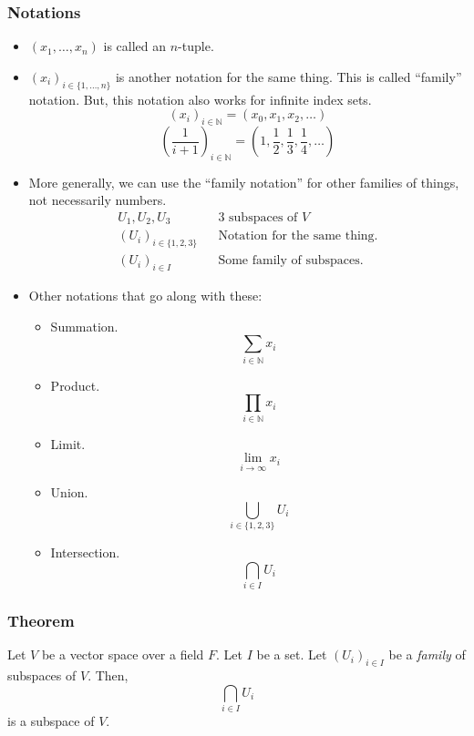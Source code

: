 \documentclass[11pt]{article}
\begin{document}
    \subsubsection{Notations}

    \begin{itemize}
        \item \((x_1, \dots, x_n)\) is called an $n$-tuple.
        \item \((x_i)_{i \in \{1, \dots, n\}}\) is another notation for the same thing. This is called ``family'' notation. But, this notation also works for infinite index sets. \[ (x_i)_{i \in \mathbb{N}} = (x_0, x_1, x_2, \dots) \] \[ \left( \frac{1}{i + 1} \right)_{i \in \mathbb{N}} = \left( 1, \frac{1}{2}, \frac{1}{3}, \frac{1}{4}, \dots \right) \]
        \item More generally, we can use the ``family notation'' for other families of things, not necessarily numbers. 
        \begin{align*}
            U_1, U_2, U_3 && \text{3 subspaces of $V$} \\
            (U_i)_{i \in \{ 1,2,3 \}} && \text{Notation for the same thing.} \\
            (U_i)_{i \in I} && \text{Some family of subspaces.}
        \end{align*}

        \pagebreak
        
        \item Other notations that go along with these:
        \begin{itemize}
            \item Summation. \[\sum_{i \in \mathbb{N}} x_i\]
            \item Product. \[\prod_{i \in \mathbb{N}} x_i \]
            \item Limit. \[\lim_{i \to \infty} x_i\]
            \item Union. \[ \bigcup_{i \in \{1,2,3\}} U_i \]
            \item Intersection. \[ \bigcap_{i \in I} U_i\] 
        \end{itemize}
    \end{itemize}

    \subsubsection{Theorem}

    Let $V$ be a vector space over a field $F$. Let $I$ be a set. Let \((U_i)_{i \in I}\) be a \emph{family} of subspaces of $V$. Then, \[\bigcap_{i \in I} U_i\] is a subspace of $V$.
\end{document}

